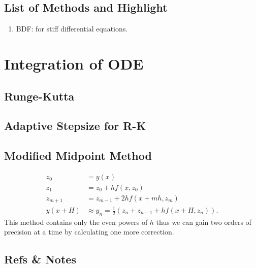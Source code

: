 \documentclass[letterpaper,12pt,english]{sphinxmanual}
\begin{document}
\subsection{List of Methods and Highlight}
\label{\detokenize{integral/methods:list-of-methods-and-highlight}}\begin{enumerate}
\item {} 
\sphinxquotedblleft{}BDF\sphinxquotedblright{}: for stiff differential equations.

\end{enumerate}


\section{Integration of ODE}
\label{\detokenize{integral/integrationODE::doc}}\label{\detokenize{integral/integrationODE:integration-of-ode}}

\subsection{Runge-Kutta}
\label{\detokenize{integral/integrationODE:runge-kutta}}

\subsection{Adaptive Stepsize for R-K}
\label{\detokenize{integral/integrationODE:adaptive-stepsize-for-r-k}}

\subsection{Modified Midpoint Method}
\label{\detokenize{integral/integrationODE:modified-midpoint-method}}\begin{equation*}
\begin{split}z_0 &= y(x) \\
z_1 &= z_0 + h f(x,z_0) \\
z_{m+1} &= z_{m-1} + 2h f(x+mh,z_m) \\
y(x+H) &\approx y_n = \frac{1}{2} \left( z_n + z_{n-1} + h f(x+H,z_n) \right) .\end{split}
\end{equation*}
This method contains only the even powers of \(h\) thus we can gain two orders of precision at a time by calculating one more correction.


\subsection{Refs \& Notes}
\label{\detokenize{integral/integrationODE:refs-notes}}
\end{document}
